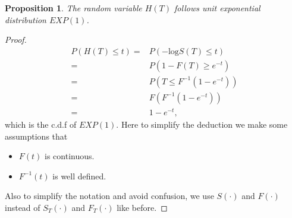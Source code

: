 \documentclass[a4paper,12pt]{article}
\newtheorem{prop}{Proposition}
\begin{document}
\begin{prop}
  The random variable $H\left(T\right)$ follows unit exponential distribution $EXP(1)$.
\end{prop}
\begin{proof}
  \[
    \begin{aligned}
      P\left(H\left(T\right)\leq t\right)
      =& P\left(-\mathrm{log} S\left(T\right) \leq t\right)    \\
      =& P\left(1 - F\left(T\right) \geq e^{-t}\right)    \\
      =& P\left(T \leq F^{-1}\left(1 - e^{-t}\right)\right)    \\
      =& F\left(F^{-1}\left(1 - e^{-t}\right)\right)    \\
      =& 1 - e^{-t}
      , 
    \end{aligned}    
  \]
  which is the c.d.f of $EXP\left(1\right)$. Here to simplify the deduction we make some assumptions that
  \begin{itemize}
  \item $F\left(t\right)$ is continuous.
  \item $F^{-1}\left(t\right)$ is well defined.
  \end{itemize}
  Also to simplify the notation and avoid confusion, we use $S\left(\cdot\right)$ and $F\left(\cdot\right)$ instead of $S_T\left(\cdot\right)$ and $F_T\left(\cdot\right)$ like before.
\end{proof}
\end{document}
